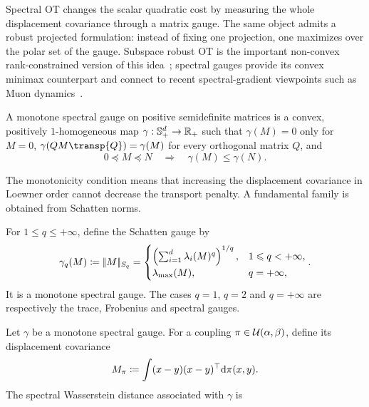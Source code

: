 Spectral OT changes the scalar quadratic cost by measuring the whole displacement covariance through a matrix gauge. The same object admits a robust projected formulation: instead of fixing one projection, one maximizes over the polar set of the gauge. Subspace robust OT is the important non-convex rank-constrained version of this idea~\cite{paty2019subspace}; spectral gauges provide its convex minimax counterpart and connect to recent spectral-gradient viewpoints such as Muon dynamics~\cite{peyre2026muon}.

\begin{defn}\label{def-monotone-spectral-gauge}
	A monotone spectral gauge on positive semidefinite matrices is a convex, positively $1$-homogeneous map $\gamma:\mathbb S_+^d\to\mathbb{R}_+$ such that $\gamma(M)=0$ only for $M=0$, $\gamma(QM\transp{Q})=\gamma(M)$ for every orthogonal matrix $Q$, and
	\[
		0\preceq M\preceq N
		\quad\Longrightarrow\quad
		\gamma(M)\leq\gamma(N).
	\]
\end{defn}
The monotonicity condition means that increasing the displacement covariance in Loewner order cannot decrease the transport penalty. A fundamental family is obtained from Schatten norms.

\begin{defn}\label{def-schatten-gauge}
	For $1\leq q\leq+\infty$, define the Schatten gauge by
	\[
		\gamma_q(M)\coloneqq|\!| M |\!|_{S_q}
		=
		\begin{cases}
			\left( \sum_{i=1}^d\lambda_i(M)^q \right)^{1/q}, & 1\leqslant q<+\infty,\\
			\lambda_{\max}(M), & q=+\infty,
		\end{cases}.
	\]
	It is a monotone spectral gauge. The cases $q=1$, $q=2$ and $q=+\infty$ are respectively the trace, Frobenius and spectral gauges.
\end{defn}

\begin{defn}\label{def-spectral-wasserstein}
	Let $\gamma$ be a monotone spectral gauge. For a coupling $\pi\in\mathcal{U}(\alpha,\beta)$, define its displacement covariance
	\[
		M_\pi\coloneqq\int (x-y)(x-y)^\top\mathrm{d}\pi(x,y).
	\]
	The spectral Wasserstein distance associated with $\gamma$ is
\end{defn}

